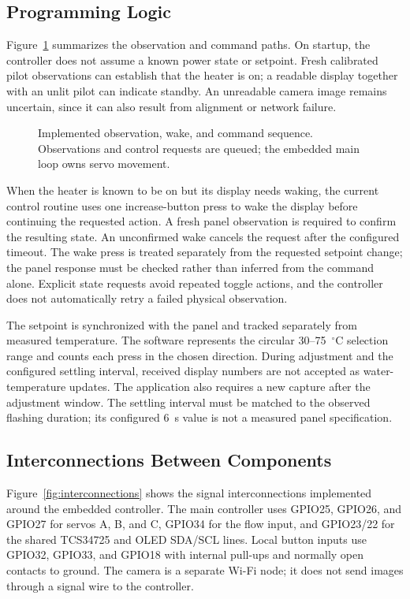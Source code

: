 \subsection{Programming Logic}
Figure~\ref{fig:control-flow} summarizes the observation and command paths. On startup, the controller does not assume a known power state or setpoint. Fresh calibrated pilot observations can establish that the heater is on; a readable display together with an unlit pilot can indicate standby. An unreadable camera image remains uncertain, since it can also result from alignment or network failure.

\begin{figure}[htbp]
\centering
\resizebox{0.97\linewidth}{!}{}
\caption{Implemented observation, wake, and command sequence. Observations and control requests are queued; the embedded main loop owns servo movement.}
\label{fig:control-flow}
\end{figure}

When the heater is known to be on but its display needs waking, the current control routine uses one increase-button press to wake the display before continuing the requested action. A fresh panel observation is required to confirm the resulting state. An unconfirmed wake cancels the request after the configured timeout. The wake press is treated separately from the requested setpoint change; the panel response must be checked rather than inferred from the command alone. Explicit state requests avoid repeated toggle actions, and the controller does not automatically retry a failed physical observation.

The setpoint is synchronized with the panel and tracked separately from measured temperature. The software represents the circular 30--75~$^\circ$C selection range and counts each press in the chosen direction. During adjustment and the configured settling interval, received display numbers are not accepted as water-temperature updates. The application also requires a new capture after the adjustment window. The settling interval must be matched to the observed flashing duration; its configured 6~s value is not a measured panel specification.

\subsection{Interconnections Between Components}
Figure~\ref{fig:interconnections} shows the signal interconnections implemented around the embedded controller. The main controller uses GPIO25, GPIO26, and GPIO27 for servos A, B, and C, GPIO34 for the flow input, and GPIO23/22 for the shared TCS34725 and OLED SDA/SCL lines. Local button inputs use GPIO32, GPIO33, and GPIO18 with internal pull-ups and normally open contacts to ground. The camera is a separate Wi-Fi node; it does not send images through a signal wire to the controller.

